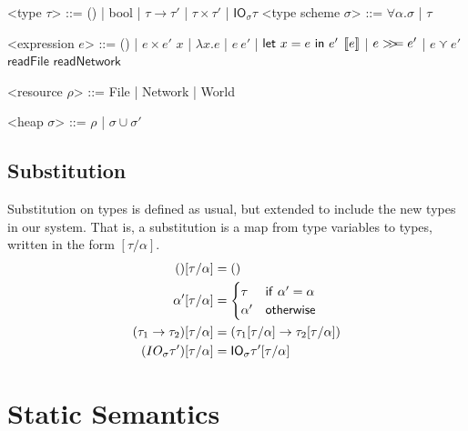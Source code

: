 \begin{grammar}

  <type $\tau$> ::= () | bool | $\tau \rightarrow \tau'$ | $\tau \times \tau'$ | $\textsf{IO}_\sigma \tau$
  <type scheme $\sigma$> ::= $\forall \alpha . \sigma$ | $\tau$

<expression $e$> ::= () | $e \times e'$
\alt $x$ | $\lambda x . e$ | $e \ e'$ | $\mathsf{let} \ x = e \ \mathsf{in} \ e'$
\alt $[\![ e]\!]$ | $e >\!\!>\!\!= e'$ | $e \curlyvee e'$
\alt $\textsf{readFile}$
\alt $\textsf{readNetwork}$

<resource $\rho$> ::= \textsf{File} | \textsf{Network} | \textsf{World}

<heap $\sigma$> ::= $\rho$ | $\sigma \cup \sigma'$

\end{grammar}

\subsection{Substitution}
Substitution on types is defined as usual, but extended to include the
new types in our system. That is, a substitution is a map from type
variables to types, written in the form $[\tau/\alpha]$. 
\begin{align*}
  () [\tau/\alpha] &= () \\
  \alpha' [\tau/\alpha] &=
             \begin{cases}
               \tau & \mathsf{if} \ \alpha' = \alpha \\
               \alpha' & \mathsf{otherwise}
             \end{cases} \\
  (\tau_1 \rightarrow \tau_2)[\tau/\alpha] &= (\tau_1[\tau/\alpha] \rightarrow \tau_2[\tau/\alpha]) \\
  (IO_\sigma \tau')[\tau/\alpha] &= \mathsf{IO}_\sigma \tau'[\tau/\alpha]
\end{align*}

\section{Static Semantics}

